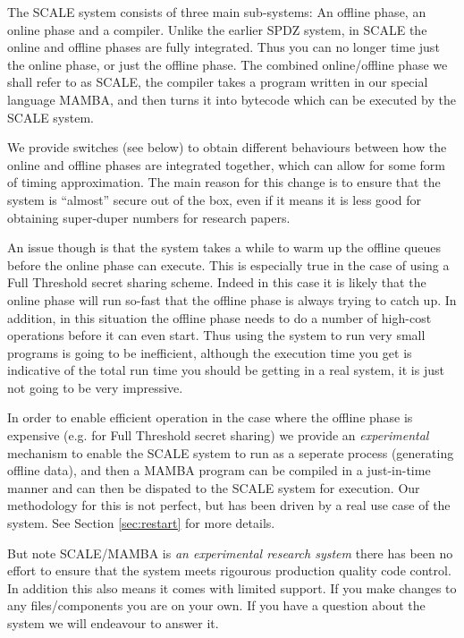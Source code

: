 

\label{sec:introduction}
The SCALE system consists of three main sub-systems:
An offline phase, an online phase and a compiler. 
Unlike the earlier SPDZ system, in SCALE the online
and offline phases are fully integrated. Thus you
can no longer time just the online phase, or just
the offline phase.
The combined online/offline phase we shall refer
to as SCALE, the compiler takes a program written
in our special language MAMBA, and then turns it
into bytecode which can be executed by the SCALE
system.

We provide switches (see below) to obtain 
different behaviours between how the online and offline
phases are integrated together, which can allow for
some form of timing approximation.
The main reason for this change is to ensure that the
system is ``almost'' secure out of the box, even if it
means it is less good for obtaining super-duper numbers
for research papers.

An issue though is that the system takes a while to warm
up the offline queues before the online phase can execute.
This is especially true in the case of using a Full Threshold
secret sharing scheme. Indeed in this case it is likely
that the online phase will run so-fast that the offline
phase is always trying to catch up. In addition, in this
situation the offline phase needs to do a number of
high-cost operations before it can even start. Thus
using the system to run very small programs is going to
be inefficient, although the execution time you get
is indicative of the total run time you should be getting
in a real system, it is just not going to be very
impressive.

In order to enable efficient operation in the case where the
offline phase is expensive (e.g. for Full Threshold secret sharing)
we provide an {\em experimental} mechanism to enable the SCALE system to run
as a seperate process (generating offline data), and then
a MAMBA program can be compiled in a just-in-time manner
and can then be dispated to the SCALE system for
execution. Our methodology for this is not perfect, but has
been driven by a real use case of the system.
See Section \ref{sec:restart} for more details.

But note SCALE/MAMBA is {\em an experimental research system} 
there has been no effort to ensure that the system meets rigourous production
quality code control. 
In addition this also means it comes with limited support.
If you make changes to any files/components you are on your
own.
If you have a question about the system we will endeavour to
answer it.

